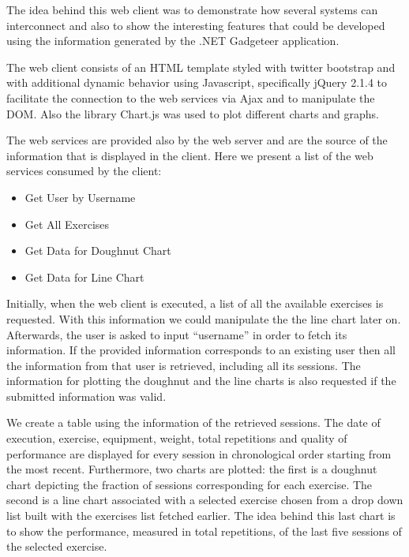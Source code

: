 \documentclass{tk3-team}
\begin{document}
The idea behind this web client was to demonstrate how several systems can interconnect and also to show the interesting features that could be developed using the information generated by the .NET Gadgeteer application. 

The web client consists of an HTML template styled with twitter bootstrap and with additional dynamic behavior using Javascript, specifically jQuery 2.1.4 to facilitate the connection to the web services via Ajax and to manipulate the DOM. Also the library Chart.js was used to plot different charts and graphs. 

The web services are provided also by the web server and are the source of the information that is displayed in the client. Here we present a list of the web services consumed by the client:

\begin{itemize}
	\item Get User by Username
	\item Get All Exercises
	\item Get Data for Doughnut Chart
	\item Get Data for Line Chart
\end{itemize}

Initially, when the web client is executed, a list of all the available exercises is requested. With this information we could manipulate the the line chart later on. Afterwards, the user is asked to input ``username'' in order to fetch its information. If the provided information corresponds to an existing user then all the information from that user is retrieved, including all its sessions. The information for plotting the doughnut and the line charts is also requested if the submitted information was valid.

We create a table using the information of the retrieved sessions. The date of execution, exercise, equipment, weight, total repetitions and quality of performance are displayed for every session in chronological order starting from the most recent. Furthermore, two charts are plotted: the first is a doughnut chart depicting the fraction of sessions corresponding for each exercise. The second is a line chart associated with a selected exercise chosen from a drop down list built with the exercises list fetched earlier. The idea behind this last chart is to show the performance, measured in total repetitions, of the last five sessions of the selected exercise.
\end{document}
